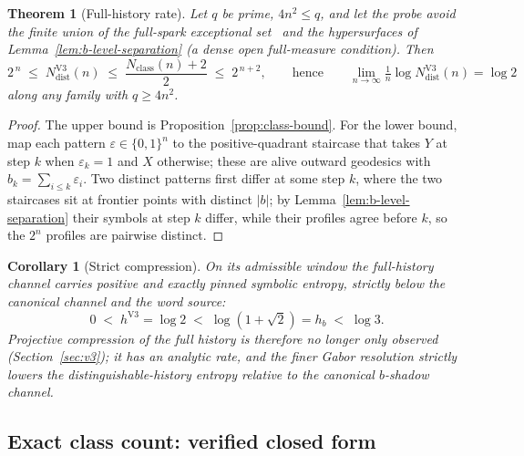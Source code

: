 \documentclass[11pt]{article}
\newtheorem{theorem}{Theorem}
\newtheorem{corollary}{Corollary}
\newcommand{\hb}{h_b}
\newcommand{\NdistV}{N^{\mathrm{V3}}_{\mathrm{dist}}}
\newcommand{\Nclass}{N_{\mathrm{class}}}
\begin{document}
\begin{theorem}[Full-history rate]
\label{thm:v3-rate}
Let $q$ be prime, $4n^2\le q$, and let the probe avoid the finite union of the full-spark exceptional
set~\cite{Lawrence2005} and the hypersurfaces of Lemma~\ref{lem:b-level-separation}
(a dense open full-measure condition).
Then
\[
2^{\,n}\;\le\;\NdistV(n)\;\le\;\frac{\Nclass(n)+2}{2}\;\le\;2^{\,n+2},
\qquad\text{hence}\qquad
\lim_{n\to\infty}\tfrac1n\log\NdistV(n)=\log 2
\]
along any family with $q\ge4n^2$.
\end{theorem}

\begin{proof}
The upper bound is Proposition~\ref{prop:class-bound}.
For the lower bound, map each pattern $\varepsilon\in\{0,1\}^n$ to the positive-quadrant staircase that
takes $Y$ at step $k$ when $\varepsilon_k=1$ and $X$ otherwise; these are alive outward geodesics with
$b_k=\sum_{i\le k}\varepsilon_i$.
Two distinct patterns first differ at some step $k$, where the two staircases sit at frontier points with
distinct $|b|$; by Lemma~\ref{lem:b-level-separation} their symbols at step $k$ differ, while their
profiles agree before $k$, so the $2^n$ profiles are pairwise distinct.
\end{proof}

\begin{corollary}[Strict compression]
\label{cor:strict-compression}
On its admissible window the full-history channel carries positive and exactly pinned symbolic entropy,
strictly below the canonical channel and the word source:
\[
0\;<\;h^{\mathrm{V3}}=\log 2\;<\;\log(1+\sqrt2)=\hb\;<\;\log 3 .
\]
Projective compression of the full history is therefore no longer only observed
(Section~\ref{sec:v3}); it has an analytic rate, and the finer Gabor resolution strictly lowers the
distinguishable-history entropy relative to the canonical $b$-shadow channel.
\end{corollary}

\subsection{Exact class count: verified closed form}
\label{sec:v3-count}
\end{document}
